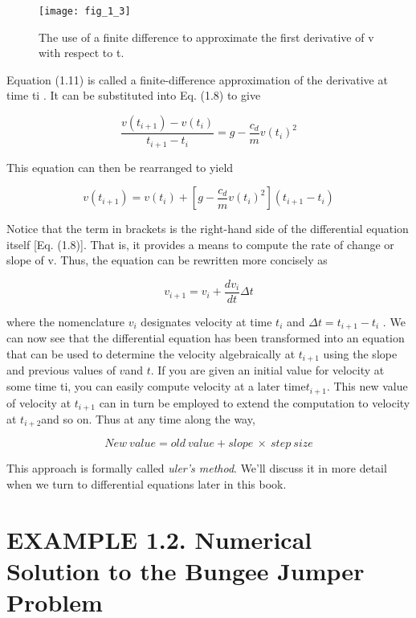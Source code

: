 \documentclass[../main.tex]{subfiles}
\begin{document}
\begin{figure}[H]
	\centering
	\texttt{[image: fig\_1\_3]}
   \caption{\textsf{The use of a finite difference to approximate the first derivative of v with respect to t.}}
   \label{fig:fig_1_3}
\end{figure}

Equation (1.11) is called a finite-difference approximation of the derivative at time ti .
It can be substituted into Eq. (1.8) to give

$$\dfrac{v(t_{i+1})-v(t_i)}{t_{i+1}-t_i}= g- \dfrac{c_d}{m}v(t_i)^2$$

This equation can then be rearranged to yield

\begin{equation}
	\tag{1.12}
	v(t_{i+1})= v(t_i)+ \left[ g- \dfrac{c_d}{m}v(t_i)^2 \right](t_{i+1}-t_i)
\end{equation}

Notice that the term in brackets is the right-hand side of the differential equation itself
[Eq. (1.8)]. That is, it provides a means to compute the rate of change or slope of v. Thus,
the equation can be rewritten more concisely as

\begin{equation}
	\tag{1.13}
	v_{i+1}=v_i + \dfrac{dv_i}{dt}\Delta t
\end{equation}

where the nomenclature $v_i$ designates velocity at time $t_i$ and $\Delta t = t_{i+1} − t_i$ .
We can now see that the differential equation has been transformed into an equation that
can be used to determine the velocity algebraically at $t_{i+1}$ using the slope and previous values
 of $v $and $t$. If you are given an initial value for velocity at some time ti, you can easily compute
  velocity at a later time$ t_{i+1}$. This new value of velocity at $ t_{i+1}$ can in turn be employed to
extend the computation to velocity at $t_{i+2} $and so on. Thus at any time along the way,

$$ New \ value = old \ value + slope \ \times  \ step \ size $$

This approach is formally called \textsl{uler's method}. We'll discuss it in more detail when we
turn to differential equations later in this book.


\section*{EXAMPLE 1.2. Numerical Solution to the Bungee Jumper Problem}
\end{document}

